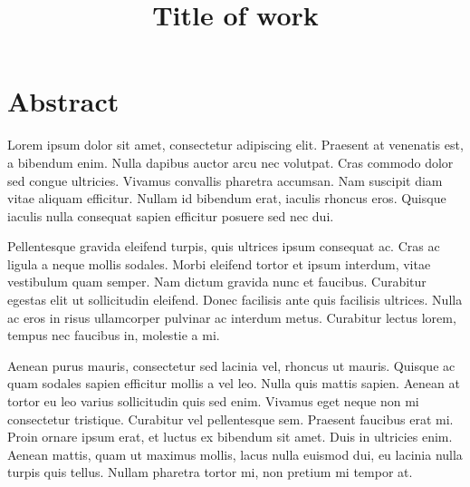 \documentclass[
    a4paper,
    11pt,              %
    DIV10,             %
    BCOR12mm,           %
    headsepline,       %
    cleardoublepage=empty,  %
    listof=totoc,       %
    bibliography=totocnumbered,  %
    chapterprefix,     %
    appendixprefix,
    numbers=noenddot,  %
    captions=tableheading,  %
]{scrbook}             %
\title{Title of work}
\author{\studentname}
\theoremstyle{break}
\begin{document}
\cleardoublepage
\graphicspath{{pictures/}}
%
\frontmatter



{
\renewcommand*\chapterheadstartvskip{\vspace*{-5\topskip}} %

} 

\chapter{Abstract}

Lorem ipsum dolor sit amet, consectetur adipiscing elit. Praesent at venenatis est, a bibendum enim. Nulla dapibus auctor arcu nec volutpat. Cras commodo dolor sed congue ultricies. Vivamus convallis pharetra accumsan. Nam suscipit diam vitae aliquam efficitur. Nullam id bibendum erat, iaculis rhoncus eros. Quisque iaculis nulla consequat sapien efficitur posuere sed nec dui.

Pellentesque gravida eleifend turpis, quis ultrices ipsum consequat ac. Cras ac ligula a neque mollis sodales. Morbi eleifend tortor et ipsum interdum, vitae vestibulum quam semper. Nam dictum gravida nunc et faucibus. Curabitur egestas elit ut sollicitudin eleifend. Donec facilisis ante quis facilisis ultrices. Nulla ac eros in risus ullamcorper pulvinar ac interdum metus. Curabitur lectus lorem, tempus nec faucibus in, molestie a mi.

Aenean purus mauris, consectetur sed lacinia vel, rhoncus ut mauris. Quisque ac quam sodales sapien efficitur mollis a vel leo. Nulla quis mattis sapien. Aenean at tortor eu leo varius sollicitudin quis sed enim. Vivamus eget neque non mi consectetur tristique. Curabitur vel pellentesque sem. Praesent faucibus erat mi. Proin ornare ipsum erat, et luctus ex bibendum sit amet. Duis in ultricies enim. Aenean mattis, quam ut maximus mollis, lacus nulla euismod dui, eu lacinia nulla turpis quis tellus. Nullam pharetra tortor mi, non pretium mi tempor at.

%

\tableofcontents

\mainmatter          %
\end{document}
